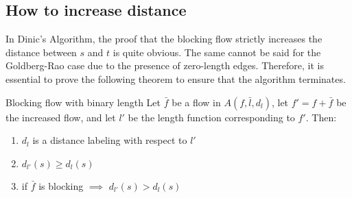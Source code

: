     \subsection{How to increase distance}
    In Dinic's Algorithm, the proof that the blocking flow strictly increases the distance between $s$ and $t$ is quite obvious.
    The same cannot be said for the Goldberg-Rao case due to the presence of zero-length edges. Therefore, it is essential to prove the following theorem to ensure that the algorithm terminates.
    \begin{theorem}{Blocking flow with binary length}{}
        Let $\bar{f}$ be a flow in $A(f,\bar{l}, d_l)$, let $f' = f + \bar{f}$ be the increased flow, and let 
        $l'$ be the length function corresponding to $f'$.
        Then:
        \begin{enumerate}
            \item $d_l$ is a distance labeling with respect to $l'$
            \item $d_{l'}(s) \ge d_l(s)$
            \item if $\bar{f}$ is blocking $\implies$ $d_{l'}(s) > d_l(s)$
        \end{enumerate}
    \end{theorem}
